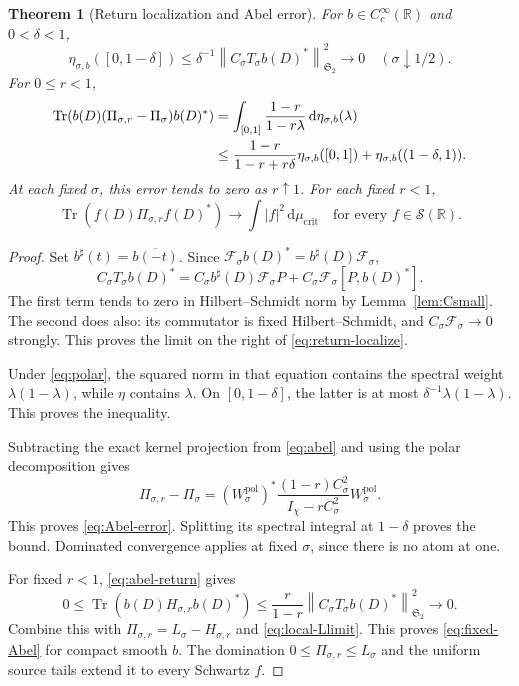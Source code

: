 \documentclass[11pt]{article}
\numberwithin{equation}{section}
\newtheorem{theorem}{Theorem}[section]
\theoremstyle{definition}
\theoremstyle{remark}
\newcommand{\Sch}{\mathcal S}
\newcommand{\Tr}{\operatorname{Tr}}
\newcommand{\Id}{I}
\newcommand{\Fcal}{\mathcal F}
\newcommand{\Stwo}{\mathfrak S_2}
\newcommand{\norm}[1]{\left\lVert #1\right\rVert}
\newcommand{\dd}{\,\mathrm d}
\newcommand{\mucrit}{\mu_{\mathrm{crit}}}
\begin{document}
\begin{theorem}[Return localization and Abel error]\label{thm:return}
For \(b\in C_c^\infty(\mathbb R)\) and \(0<\delta<1\),
\begin{equation}\label{eq:return-localize}
\eta_{\sigma,b}([0,1-\delta])
\le \delta^{-1}\norm{C_\sigma T_\sigma b(D)^*}_{\Stwo}^2
\longrightarrow0
\quad(\sigma\downarrow1/2).
\end{equation}
For \(0\le r<1\),
\begin{align}
\Tr\!\left(b(D)(\Pi_{\sigma,r}-\Pi_\sigma)b(D)^*\right)
&=\int_{[0,1]}\frac{1-r}{1-r\lambda}\dd\eta_{\sigma,b}(\lambda)
\label{eq:Abel-error}\\
&\le
\frac{1-r}{1-r+r\delta}\eta_{\sigma,b}([0,1])
+\eta_{\sigma,b}((1-\delta,1)).
\notag
\end{align}
At each fixed \(\sigma\), this error tends to zero as \(r\uparrow1\).
For each fixed \(r<1\),
\begin{equation}\label{eq:fixed-Abel}
\Tr(f(D)\Pi_{\sigma,r}f(D)^*)\longrightarrow
\int |f|^2\dd\mucrit
\quad\text{for every }f\in\Sch(\mathbb R).
\end{equation}
\end{theorem}
\begin{proof}
Set \(b^\sharp(t)=\overline{b(-t)}\).
Since \(\Fcal_\sigma b(D)^*=b^\sharp(D)\Fcal_\sigma\),
\begin{equation}\label{eq:CTsmall}
C_\sigma T_\sigma b(D)^*
=C_\sigma b^\sharp(D)\Fcal_\sigma P
+C_\sigma\Fcal_\sigma[P,b(D)^*].
\end{equation}
The first term tends to zero in Hilbert--Schmidt norm by
Lemma~\ref{lem:Csmall}. The second does also: its commutator is
fixed Hilbert--Schmidt, and
\(C_\sigma\Fcal_\sigma\to0\) strongly.
This proves the limit on the right of \eqref{eq:return-localize}.

Under \eqref{eq:polar}, the squared norm in that equation contains
the spectral weight \(\lambda(1-\lambda)\), while \(\eta\)
contains \(\lambda\). On \([0,1-\delta]\), the latter is at most
\(\delta^{-1}\lambda(1-\lambda)\). This proves the inequality.

Subtracting the exact kernel projection from \eqref{eq:abel}
and using the polar decomposition gives
\[
\Pi_{\sigma,r}-\Pi_\sigma
=(W_\sigma^{\mathrm{pol}})^*
\frac{(1-r)C_\sigma^2}{\Id_\chi-rC_\sigma^2}
W_\sigma^{\mathrm{pol}}.
\]
This proves \eqref{eq:Abel-error}. Splitting its spectral integral
at \(1-\delta\) proves the bound. Dominated convergence applies
at fixed \(\sigma\), since there is no atom at one.

For fixed \(r<1\), \eqref{eq:abel-return} gives
\[
0\le\Tr(b(D)H_{\sigma,r}b(D)^*)
\le\frac{r}{1-r}
\norm{C_\sigma T_\sigma b(D)^*}_{\Stwo}^2\longrightarrow0.
\]
Combine this with \(\Pi_{\sigma,r}=L_\sigma-H_{\sigma,r}\)
and \eqref{eq:local-Llimit}. This proves \eqref{eq:fixed-Abel}
for compact smooth \(b\). The domination
\(0\le\Pi_{\sigma,r}\le L_\sigma\) and the uniform source tails
extend it to every Schwartz \(f\).
\end{proof}
\end{document}
